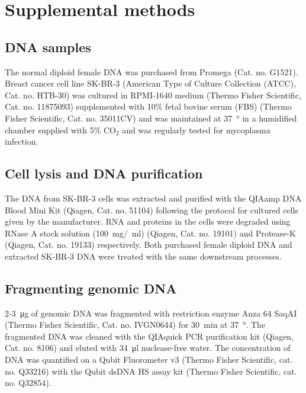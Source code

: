 \chapter{Supplemental methods}
\label{appendA}

\section*{DNA samples}
The normal diploid female DNA was purchased from Promega (Cat. no.
G1521).  Breast cancer cell line SK-BR-3 (American Type of Culture
Collection (ATCC), Cat. no. HTB-30) was cultured in RPMI-1640 medium
(Thermo Fisher Scientific, Cat. no. 11875093) supplemented with 10\%
fetal bovine serum (FBS) (Thermo Fisher Scientific, Cat. no. 35011CV)
and was maintained at \SI{37}{\degree} in a humidified chamber supplied
with 5\% $\text{CO}_2$ and was regularly tested for mycoplasma
infection.

\section*{Cell lysis and DNA purification}
The DNA from SK-BR-3 cells was extracted and purified with the QIAamp
DNA Blood Mini Kit (Qiagen, Cat. no. 51104) following the protocol for
cultured cells given by the manufacturer. RNA and proteins in the cells
were degraded using RNase A stock solution
(\SI{100}{\milli\gram}/\SI{}{\milli\litre}) (Qiagen, Cat.  no. 19101)
and Protease-K (Qiagen, Cat. no. 19133) respectively. Both purchased
female diploid DNA and extracted SK-BR-3 DNA were treated with the same
downstream processes.

\section*{Fragmenting genomic DNA}
2-\SI{3}{\micro\gram} of genomic DNA was fragmented with restriction
enzyme Anza 64 SaqAI (Thermo Fisher Scientific, Cat. no. IVGN0644) for
\SI{30}{\minute} at \SI{37}{\degree}. The fragmented DNA was cleaned
with the QIAquick PCR purification kit (Qiagen, Cat. no. 8106) and
eluted with \SI{34}{\micro\litre} nuclease-free water. The concentration
of DNA was quantified on a Qubit Fluorometer v3 (Thermo Fisher
Scientific, cat. no. Q33216) with the Qubit dsDNA HS assay kit (Thermo
Fisher Scientific, cat. no. Q32854).

